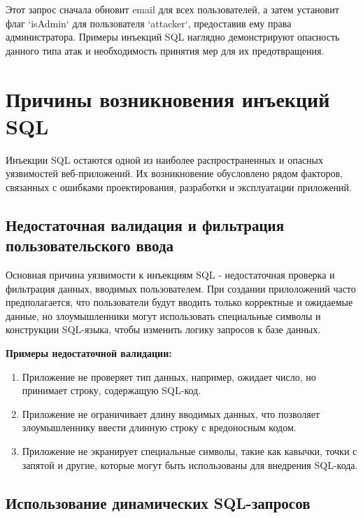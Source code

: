 \documentclass[a4paper,12pt]{diplom}
\begin{document}
	Этот запрос сначала обновит email для всех пользователей, а затем установит флаг `isAdmin` для пользователя `attacker`,  предоставив ему права администратора. 
	Примеры инъекций SQL наглядно демонстрируют опасность данного типа атак и необходимость принятия мер для их предотвращения.
	
	
	
	
	
	
	
	
	\section{Причины возникновения инъекций SQL}
	
	Инъекции SQL остаются одной из наиболее распространенных и опасных уязвимостей веб-приложений.  Их возникновение обусловлено рядом факторов, связанных с ошибками проектирования, разработки и эксплуатации приложений.
	
	\subsection{Недостаточная валидация и фильтрация пользовательского ввода}
	
	Основная причина уязвимости к инъекциям SQL - недостаточная проверка и фильтрация данных, вводимых пользователем.  При создании прилоложений часто предполагается, что пользователи будут вводить только корректные и ожидаемые данные,  но злоумышленники могут использовать специальные символы и конструкции SQL-языка, чтобы изменить логику запросов к базе данных.  
	
	\textbf{Примеры недостаточной валидации:}
	
	\begin{enumerate}[label=\arabic{enumi})]
		\item Приложение не проверяет тип данных, например, ожидает число, но принимает строку, содержащую SQL-код.
		\item Приложение не ограничивает длину вводимых данных, что позволяет злоумышленнику ввести длинную строку с вредоносным кодом.
		\item Приложение не экранирует специальные символы, такие как кавычки, точки с запятой и другие, которые могут быть использованы для внедрения SQL-кода.
	\end{enumerate}
	
	\subsection{Использование динамических SQL-запросов}
	
\end{document}
